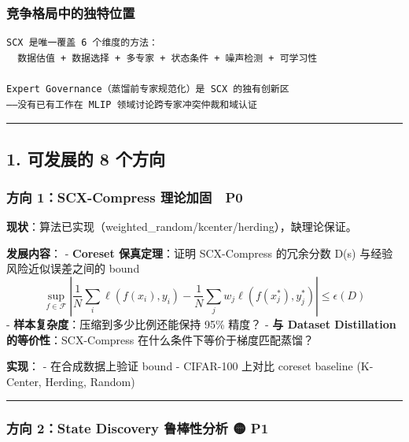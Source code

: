 \documentclass[
  12pt,
]{ctexart}
\begin{document}
\subsubsection{竞争格局中的独特位置}\label{ux7adeux4e89ux683cux5c40ux4e2dux7684ux72ecux7279ux4f4dux7f6e}

\begin{verbatim}
SCX 是唯一覆盖 6 个维度的方法：
  数据估值 + 数据选择 + 多专家 + 状态条件 + 噪声检测 + 可学习性

Expert Governance（蒸馏前专家规范化）是 SCX 的独有创新区
——没有已有工作在 MLIP 领域讨论跨专家冲突仲裁和域认证
\end{verbatim}

\begin{center}\rule{0.5\linewidth}{0.5pt}\end{center}

\subsection{1. 可发展的 8
个方向}\label{ux53efux53d1ux5c55ux7684-8-ux4e2aux65b9ux5411}

\subsubsection{方向 1：SCX-Compress 理论加固 🔴
P0}\label{ux65b9ux5411-1scx-compress-ux7406ux8bbaux52a0ux56fa-p0}

\textbf{现状}：算法已实现（weighted\_random/kcenter/herding），缺理论保证。

\textbf{发展内容}： - \textbf{Coreset 保真定理}：证明 SCX-Compress
的冗余分数 D(s) 与经验风险近似误差之间的 bound
\[\sup_{f \in \mathcal{F}} \left|\frac{1}{N}\sum_i \ell(f(x_i),y_i) - \frac{1}{N}\sum_j w_j \ell(f(x_j^*),y_j^*)\right| \leq \epsilon(D)\]
- \textbf{样本复杂度}：压缩到多少比例还能保持 95\% 精度？ - \textbf{与
Dataset Distillation 的等价性}：SCX-Compress
在什么条件下等价于梯度匹配蒸馏？

\textbf{实现}： - 在合成数据上验证 bound - CIFAR-100 上对比 coreset
baseline (K-Center, Herding, Random)

\begin{center}\rule{0.5\linewidth}{0.5pt}\end{center}

\subsubsection{方向 2：State Discovery 鲁棒性分析 🟡
P1}\label{ux65b9ux5411-2state-discovery-ux9c81ux68d2ux6027ux5206ux6790-p1}
\end{document}
